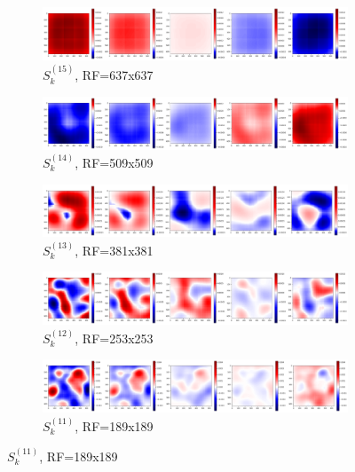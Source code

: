 \documentclass[preprint]{elsarticle}
\theoremstyle{definition} %
\theoremstyle{remark}
\begin{document}
\begin{figure}[h!]
	\centering
	\begin{subfigure}[b]{\textwidth}
		\includegraphics[width=\textwidth]{figures/score-prop-23713_left/score_k637.png}
		\caption{$S_k^{(15)}$, RF=637x637}
		\label{fig:score_k637}
	\end{subfigure}
	
	\begin{subfigure}[b]{\textwidth}
		\includegraphics[width=\textwidth]{figures/score-prop-23713_left/score_k509.png}
		\caption{$S_k^{(14)}$, RF=509x509}
		\label{fig:score_k509}
	\end{subfigure}
	
	\begin{subfigure}[b]{\textwidth}
		\includegraphics[width=\textwidth]{figures/score-prop-23713_left/score_k381.png}
		\caption{$S_k^{(13)}$, RF=381x381}
		\label{fig:score_k381}
	\end{subfigure}

	\begin{subfigure}[b]{\textwidth}
		\includegraphics[width=\textwidth]{figures/score-prop-23713_left/score_k253.png}
		\caption{$S_k^{(12)}$, RF=253x253}
		\label{fig:score_k253}
	\end{subfigure}

	\begin{subfigure}[b]{\textwidth}
		\includegraphics[width=\textwidth]{figures/score-prop-23713_left/score_k189.png}
		\caption{$S_k^{(11)}$, RF=189x189}
		\label{fig:score_k189}
	\end{subfigure}


\end{figure}
\end{document}

